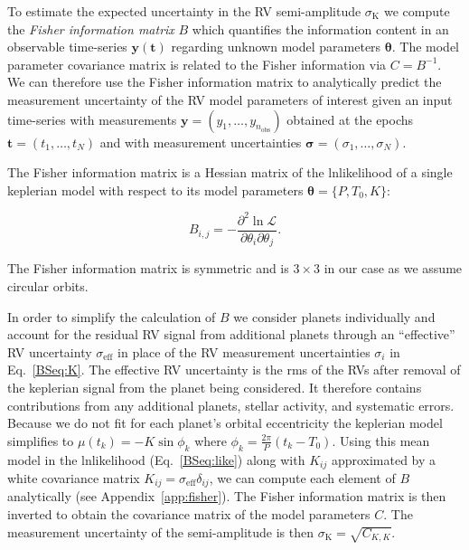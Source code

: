 To estimate the expected uncertainty in the RV semi-amplitude $\sigma_{\text{K}}$ we compute the
\emph{Fisher information matrix} $B$ which quantifies the information content in an observable time-series
$\mathbf{y}(\mathbf{t})$ regarding unknown model parameters $\boldsymbol{\theta}$. The model parameter
covariance matrix is related to the Fisher information via $C=B^{-1}$. We can therefore
use the Fisher information matrix to analytically predict the measurement uncertainty of the RV model
parameters of interest given an input time-series with \nobs{} measurements $\mathbf{y}=(y_1,\dots,y_{n_{\text{obs}}})$
obtained at the epochs $\mathbf{t}=(t_1,\dots,t_N)$ and with measurement uncertainties
$\boldsymbol{\sigma}=(\sigma_1,\dots,\sigma_N)$.

The Fisher information matrix is a Hessian matrix of the lnlikelihood of a single keplerian model 
with respect to its model parameters $\boldsymbol{\theta}=\{P,T_0,K\}$:

\begin{equation}
  B_{i,j} = -\frac{\partial^2 \ln{\mathcal{L}}}{\partial \theta_i \partial \theta_j}.
\end{equation}

\noindent The Fisher information matrix is symmetric and is $3 \times 3$ in our case as
we assume circular orbits.

In order to simplify the calculation of 
$B$ we consider planets individually and account for the residual RV signal from additional planets
through an ``effective'' RV uncertainty $\sigma_{\text{eff}}$
in place of the RV measurement uncertainties $\sigma_i$
in Eq.~\ref{BSeq:K}. The effective RV uncertainty is the rms of the RVs
after removal of the keplerian signal from the planet being considered. It therefore contains
contributions from any additional planets, stellar activity, and systematic errors.
Because we do not fit for each planet's orbital eccentricity the
keplerian model simplifies to $\mu(t_k) = -K \sin{\phi_k}$ where $\phi_k = \frac{2\pi}{P} (t_k-T_0)$.
Using this mean model in the lnlikelihood (Eq.~\ref{BSeq:like}) along with $K_{ij}$ approximated by a
white covariance matrix $K_{ij} = \sigma_{\text{eff}} \delta_{ij}$, we can compute each element of $B$ analytically
(see Appendix~\ref{app:fisher}). The Fisher information matrix
is then inverted to obtain the covariance matrix of the model
parameters $C$. The measurement uncertainty of the semi-amplitude is then $\sigma_{\text{K}} = \sqrt{C_{K,K}}$.


